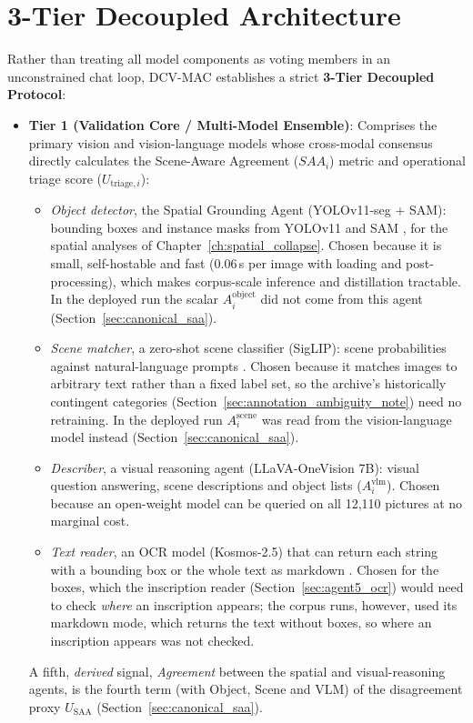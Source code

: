 \documentclass[12pt,a4paper]{report}
\begin{document}
\section{3-Tier Decoupled Architecture}
\label{sec:tiers}
Rather than treating all model components as voting members in an unconstrained chat loop, DCV-MAC establishes a strict \textbf{3-Tier Decoupled Protocol}:

\begin{itemize}
    \item \textbf{Tier 1 (Validation Core / Multi-Model Ensemble)}: Comprises the primary vision and vision-language models whose cross-modal consensus directly calculates the Scene-Aware Agreement ($SAA_i$) metric and operational triage score ($U_{\text{triage}, i}$):
    \begin{itemize}
        \item \textit{Object detector}, the Spatial Grounding Agent (YOLOv11-seg + SAM): bounding boxes and instance masks from YOLOv11 \cite{yolov11_2024} and SAM \cite{sam2023}, for the spatial analyses of Chapter~\ref{ch:spatial_collapse}. Chosen because it is small, self-hostable and fast ($0.06$\,s per image with loading and post-processing), which makes corpus-scale inference and distillation tractable. In the deployed run the scalar $A_i^{\text{object}}$ did not come from this agent (Section~\ref{sec:canonical_saa}).
        \item \textit{Scene matcher}, a zero-shot scene classifier (SigLIP): scene probabilities against natural-language prompts \cite{siglip2023}. Chosen because it matches images to arbitrary text rather than a fixed label set, so the archive's historically contingent categories (Section~\ref{sec:annotation_ambiguity_note}) need no retraining. In the deployed run $A_i^{\text{scene}}$ was read from the vision-language model instead (Section~\ref{sec:canonical_saa}).
        \item \textit{Describer}, a visual reasoning agent (LLaVA-OneVision 7B): visual question answering, scene descriptions and object lists \cite{llava_onevision2024} ($A_i^{\text{vlm}}$). Chosen because an open-weight model can be queried on all 12,110 pictures at no marginal cost.
        \item \textit{Text reader}, an OCR model (Kosmos-2.5) that can return each string with a bounding box or the whole text as markdown \cite{kosmos2_5_2024}. Chosen for the boxes, which the inscription reader (Section~\ref{sec:agent5_ocr}) would need to check \emph{where} an inscription appears; the corpus runs, however, used its markdown mode, which returns the text without boxes, so where an inscription appears was not checked.
    \end{itemize}
    A fifth, \emph{derived} signal, \textit{Agreement} between the spatial and visual-reasoning agents, is the fourth term (with Object, Scene and VLM) of the disagreement proxy $U_{\text{SAA}}$ (Section~\ref{sec:canonical_saa}).


\end{itemize}
\end{document}
